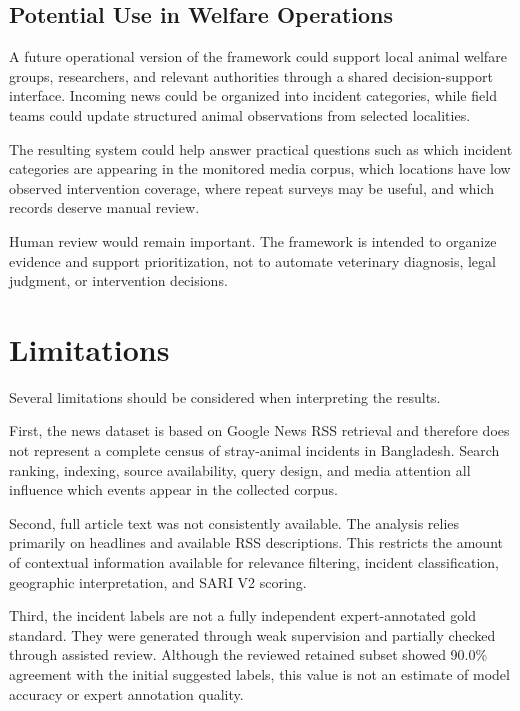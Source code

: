 \documentclass[conference]{IEEEtran}
\begin{document}
\subsection{Potential Use in Welfare Operations}

A future operational version of the framework could support local animal
welfare groups, researchers, and relevant authorities through a shared
decision-support interface. Incoming news could be organized into incident
categories, while field teams could update structured animal observations
from selected localities.

The resulting system could help answer practical questions such as which
incident categories are appearing in the monitored media corpus, which
locations have low observed intervention coverage, where repeat surveys may
be useful, and which records deserve manual review.

Human review would remain important. The framework is intended to organize
evidence and support prioritization, not to automate veterinary diagnosis,
legal judgment, or intervention decisions.


\section{Limitations}

Several limitations should be considered when interpreting the results.

First, the news dataset is based on Google News RSS retrieval and therefore
does not represent a complete census of stray-animal incidents in Bangladesh.
Search ranking, indexing, source availability, query design, and media
attention all influence which events appear in the collected corpus.

Second, full article text was not consistently available. The analysis relies
primarily on headlines and available RSS descriptions. This restricts the
amount of contextual information available for relevance filtering, incident
classification, geographic interpretation, and SARI V2 scoring.

Third, the incident labels are not a fully independent expert-annotated gold
standard. They were generated through weak supervision and partially checked
through assisted review. Although the reviewed retained subset showed 90.0\%
agreement with the initial suggested labels, this value is not an estimate of
model accuracy or expert annotation quality.
\end{document}
